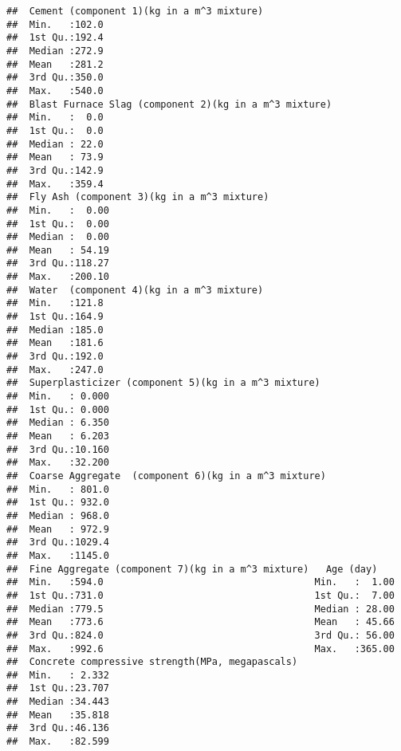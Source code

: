 \documentclass[
]{article}
\begin{document}
\begin{verbatim}
##  Cement (component 1)(kg in a m^3 mixture)
##  Min.   :102.0                            
##  1st Qu.:192.4                            
##  Median :272.9                            
##  Mean   :281.2                            
##  3rd Qu.:350.0                            
##  Max.   :540.0                            
##  Blast Furnace Slag (component 2)(kg in a m^3 mixture)
##  Min.   :  0.0                                        
##  1st Qu.:  0.0                                        
##  Median : 22.0                                        
##  Mean   : 73.9                                        
##  3rd Qu.:142.9                                        
##  Max.   :359.4                                        
##  Fly Ash (component 3)(kg in a m^3 mixture)
##  Min.   :  0.00                            
##  1st Qu.:  0.00                            
##  Median :  0.00                            
##  Mean   : 54.19                            
##  3rd Qu.:118.27                            
##  Max.   :200.10                            
##  Water  (component 4)(kg in a m^3 mixture)
##  Min.   :121.8                            
##  1st Qu.:164.9                            
##  Median :185.0                            
##  Mean   :181.6                            
##  3rd Qu.:192.0                            
##  Max.   :247.0                            
##  Superplasticizer (component 5)(kg in a m^3 mixture)
##  Min.   : 0.000                                     
##  1st Qu.: 0.000                                     
##  Median : 6.350                                     
##  Mean   : 6.203                                     
##  3rd Qu.:10.160                                     
##  Max.   :32.200                                     
##  Coarse Aggregate  (component 6)(kg in a m^3 mixture)
##  Min.   : 801.0                                      
##  1st Qu.: 932.0                                      
##  Median : 968.0                                      
##  Mean   : 972.9                                      
##  3rd Qu.:1029.4                                      
##  Max.   :1145.0                                      
##  Fine Aggregate (component 7)(kg in a m^3 mixture)   Age (day)     
##  Min.   :594.0                                     Min.   :  1.00  
##  1st Qu.:731.0                                     1st Qu.:  7.00  
##  Median :779.5                                     Median : 28.00  
##  Mean   :773.6                                     Mean   : 45.66  
##  3rd Qu.:824.0                                     3rd Qu.: 56.00  
##  Max.   :992.6                                     Max.   :365.00  
##  Concrete compressive strength(MPa, megapascals)
##  Min.   : 2.332                                 
##  1st Qu.:23.707                                 
##  Median :34.443                                 
##  Mean   :35.818                                 
##  3rd Qu.:46.136                                 
##  Max.   :82.599
\end{verbatim}
\end{document}
